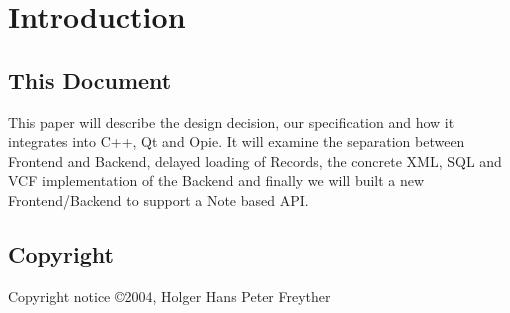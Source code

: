 \section{Introduction}

\subsection{This Document}
This paper will describe the design decision, our specification
and how it integrates into C++, Qt and Opie.
It will examine the separation between Frontend and Backend, delayed
loading of Records, the concrete XML, SQL and VCF implementation
of the Backend and finally we will built a new Frontend/Backend
to support a Note based API.

\subsection{Copyright}

Copyright notice
\copyright 2004, Holger Hans Peter Freyther
